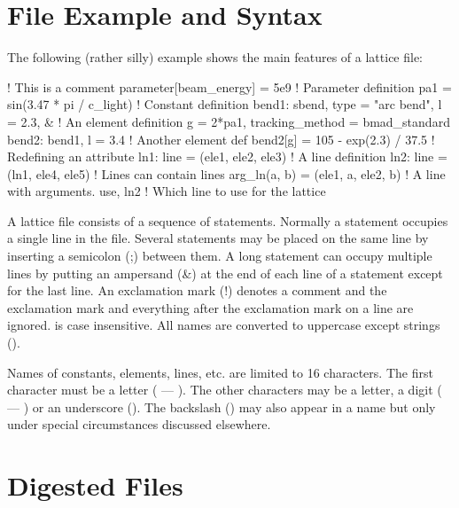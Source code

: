 \section{File Example and Syntax}

The following (rather silly) example shows the main features of a
\bmad lattice file:
\begin{example}
  ! This is a comment
  parameter[beam_energy] = 5e9                   ! Parameter definition
  pa1 = sin(3.47 * pi / c_light)                 ! Constant definition
  bend1: sbend, type = "arc bend", l = 2.3, &    ! An element definition
      g = 2*pa1, tracking_method = bmad_standard
  bend2: bend1, l = 3.4                          ! Another element def
  bend2[g] = 105 - exp(2.3) / 37.5               ! Redefining an attribute
  ln1: line = (ele1, ele2, ele3)                 ! A line definition
  ln2: line = (ln1, ele4, ele5)                  ! Lines can contain lines
  arg_ln(a, b) = (ele1, a, ele2, b)              ! A line with arguments.
  use, ln2                                       ! Which line to use for the lattice
\end{example}

A \bmad lattice file consists of a sequence of statements. Normally a
statement occupies a single line in the file. Several statements may
be placed on the same line by inserting a semicolon (;) between
them. A long statement can occupy multiple lines by putting an
ampersand (\&) at the end of each line of a statement except for the
last line. An exclamation mark (!) denotes a comment and the
exclamation mark and everything after the exclamation mark on a line
are ignored.  \bmad is case insensitive. All names are converted to
uppercase except strings ().

Names of constants, elements, lines, etc. are limited to 16
characters. The first character must be a letter ( --- ).
The other characters may be a letter, a digit ( --- ) or
an underscore (\vn{_}). The backslash (\vn{\B}) may also appear in a
name but only under special circumstances discussed elsewhere.

\section{Digested Files}
\label{s:lattice_files}

